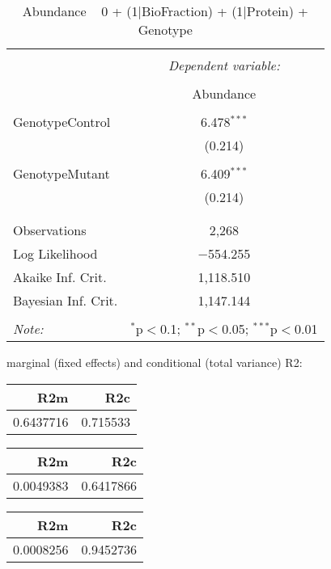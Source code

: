 \documentclass[11pt]{report}
\begin{document}
\begin{table}[!htbp] \centering 
  \caption{Abundance ~ 0 + (1|BioFraction) + (1|Protein) + Genotype} 
  \label{} 
\begin{tabular}{@{\extracolsep{5pt}}lc} 
\\[-1.8ex]\hline 
\hline \\[-1.8ex] 
 & \multicolumn{1}{c}{\textit{Dependent variable:}} \\ 
\cline{2-2} 
\\[-1.8ex] & Abundance \\ 
\hline \\[-1.8ex] 
 GenotypeControl & 6.478$^{***}$ \\ 
  & (0.214) \\ 
  & \\ 
 GenotypeMutant & 6.409$^{***}$ \\ 
  & (0.214) \\ 
  & \\ 
\hline \\[-1.8ex] 
Observations & 2,268 \\ 
Log Likelihood & $-$554.255 \\ 
Akaike Inf. Crit. & 1,118.510 \\ 
Bayesian Inf. Crit. & 1,147.144 \\ 
\hline 
\hline \\[-1.8ex] 
\textit{Note:}  & \multicolumn{1}{r}{$^{*}$p$<$0.1; $^{**}$p$<$0.05; $^{***}$p$<$0.01} \\ 
\end{tabular} 
\end{table} 
marginal (fixed effects) and conditional (total variance) R2:

\begin{tabular}{r|r}
\hline
R2m & R2c\\
\hline
0.6437716 & 0.715533\\
\hline
\end{tabular}

\begin{tabular}{r|r}
\hline
R2m & R2c\\
\hline
0.0049383 & 0.6417866\\
\hline
\end{tabular}

\begin{tabular}{r|r}
\hline
R2m & R2c\\
\hline
0.0008256 & 0.9452736\\
\hline
\end{tabular}
\end{document}
